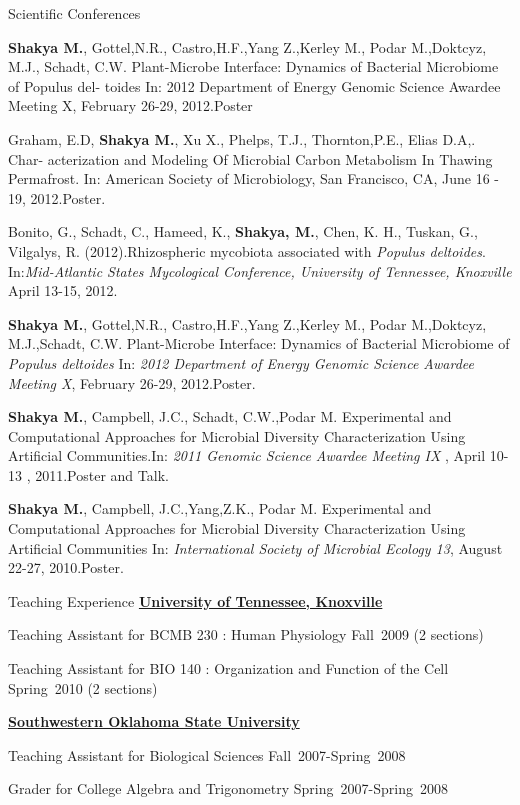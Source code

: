 \documentclass{resume} %
\begin{document}
\begin{rSection}{Scientific Conferences}
\item \textbf{Shakya M.}, Gottel,N.R., Castro,H.F.,Yang Z.,Kerley M., Podar M.,Doktcyz, M.J., Schadt, C.W. Plant-Microbe Interface: Dynamics of Bacterial Microbiome of Populus del- toides In: 2012 Department of Energy Genomic Science Awardee Meeting X, February 26-29, 2012.Poster

\item Graham, E.D, \textbf{Shakya M.}, Xu X., Phelps, T.J., Thornton,P.E., Elias D.A,. Char- acterization and Modeling Of Microbial Carbon Metabolism In Thawing Permafrost. In: American Society of Microbiology, San Francisco, CA, June 16 - 19, 2012.Poster.


\item Bonito, G., Schadt, C., Hameed, K., \textbf{Shakya, M.}, Chen, K. H., Tuskan, G., Vilgalys, R. (2012).Rhizospheric mycobiota associated with \textit{Populus deltoides}. In:\emph{Mid-Atlantic States Mycological Conference, University of Tennessee, Knoxville} April 13-15, 2012.

\item \textbf{Shakya M.}, Gottel,N.R., Castro,H.F.,Yang Z.,Kerley M., Podar M.,Doktcyz, M.J.,Schadt, C.W. Plant-Microbe Interface: Dynamics of Bacterial Microbiome of \textit{Populus deltoides}  In: \emph{2012 Department of Energy Genomic Science Awardee Meeting X}, February 26-29, 2012.Poster.

\item \textbf{Shakya M.}, Campbell, J.C., Schadt, C.W.,Podar M. Experimental and Computational Approaches for Microbial Diversity Characterization Using Artificial Communities.In: \emph{2011 Genomic Science Awardee Meeting IX }, April 10-13 , 2011.Poster and Talk.

\item \textbf{Shakya M.}, Campbell, J.C.,Yang,Z.K., Podar M. Experimental and Computational Approaches for Microbial Diversity Characterization Using Artificial Communities In: \emph{International Society of Microbial Ecology 13}, August 22-27, 2010.Poster.

\end{rSection}

\begin{rSection}{Teaching Experience}{}{}{}
\href{http://www.utk.edu}{\bf University of Tennessee, Knoxville}
\item Teaching Assistant for BCMB 230 : Human Physiology Fall~2009 (2 sections)
\item Teaching Assistant for BIO 140 : Organization and Function of the Cell  Spring~2010 (2 sections)

\href{http://www.swosu.edu}{\textbf{Southwestern Oklahoma State University}}
 \item Teaching Assistant for Biological Sciences Fall~2007-Spring~2008
\item Grader for College Algebra and Trigonometry Spring~2007-Spring~2008

\end{rSection}
\end{document}
